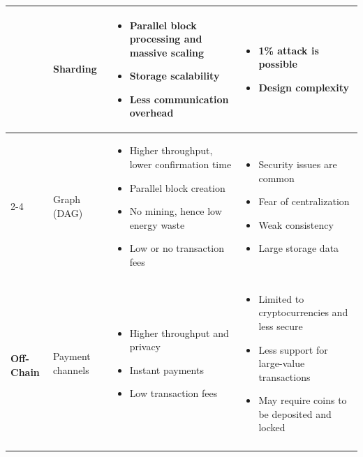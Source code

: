 \begin{table}[htbp]
{\begin{tabularx}{\textwidth}{@{}p{2.4cm} p{2.7cm} >{\raggedright\arraybackslash}X >{\raggedright\arraybackslash}X@{}}
& Sharding &
\begin{itemize}
  \item Parallel block processing and massive scaling
  \item Storage scalability
  \item Less communication overhead
\end{itemize} &
\begin{itemize}
  \item 1\% attack is possible
  \item Design complexity
\end{itemize} \\ \cmidrule(l){2-4}

& Graph (DAG) &
\begin{itemize}
  \item Higher throughput, lower confirmation time
  \item Parallel block creation
  \item No mining, hence low energy waste
  \item Low or no transaction fees
\end{itemize} &
\begin{itemize}
  \item Security issues are common
  \item Fear of centralization
  \item Weak consistency
  \item Large storage data
\end{itemize} \\
\midrule

\multirow{4}{*}{\textbf{Off-Chain}}
& Payment channels &
\begin{itemize}
  \item Higher throughput and privacy
  \item Instant payments
  \item Low transaction fees
\end{itemize} &
\begin{itemize}
  \item Limited to cryptocurrencies and less secure
  \item Less support for large-value transactions
  \item May require coins to be deposited and locked
\end{itemize} \\ \cmidrule(l){2-4}


\end{tabularx}}
\end{table}
